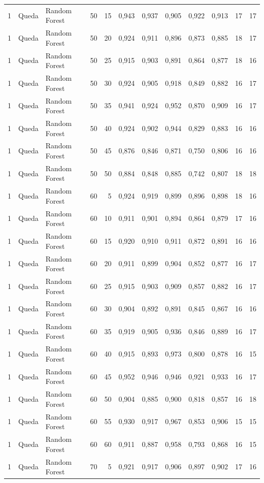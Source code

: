 \begin{longtable}{@{}rllrrrrrrrrr@{}}
1 & Queda & Random Forest & 50 & 15 & 0,943 & 0,937 & 0,905 & 0,922 & 0,913 & 17 & 17 \\
1 & Queda & Random Forest & 50 & 20 & 0,924 & 0,911 & 0,896 & 0,873 & 0,885 & 18 & 17 \\
1 & Queda & Random Forest & 50 & 25 & 0,915 & 0,903 & 0,891 & 0,864 & 0,877 & 18 & 16 \\
1 & Queda & Random Forest & 50 & 30 & 0,924 & 0,905 & 0,918 & 0,849 & 0,882 & 16 & 17 \\
1 & Queda & Random Forest & 50 & 35 & 0,941 & 0,924 & 0,952 & 0,870 & 0,909 & 16 & 17 \\
1 & Queda & Random Forest & 50 & 40 & 0,924 & 0,902 & 0,944 & 0,829 & 0,883 & 16 & 16 \\
1 & Queda & Random Forest & 50 & 45 & 0,876 & 0,846 & 0,871 & 0,750 & 0,806 & 16 & 16 \\
1 & Queda & Random Forest & 50 & 50 & 0,884 & 0,848 & 0,885 & 0,742 & 0,807 & 18 & 18 \\
1 & Queda & Random Forest & 60 & 5 & 0,924 & 0,919 & 0,899 & 0,896 & 0,898 & 18 & 16 \\
1 & Queda & Random Forest & 60 & 10 & 0,911 & 0,901 & 0,894 & 0,864 & 0,879 & 17 & 16 \\
1 & Queda & Random Forest & 60 & 15 & 0,920 & 0,910 & 0,911 & 0,872 & 0,891 & 16 & 16 \\
1 & Queda & Random Forest & 60 & 20 & 0,911 & 0,899 & 0,904 & 0,852 & 0,877 & 16 & 17 \\
1 & Queda & Random Forest & 60 & 25 & 0,915 & 0,903 & 0,909 & 0,857 & 0,882 & 16 & 17 \\
1 & Queda & Random Forest & 60 & 30 & 0,904 & 0,892 & 0,891 & 0,845 & 0,867 & 16 & 16 \\
1 & Queda & Random Forest & 60 & 35 & 0,919 & 0,905 & 0,936 & 0,846 & 0,889 & 16 & 17 \\
1 & Queda & Random Forest & 60 & 40 & 0,915 & 0,893 & 0,973 & 0,800 & 0,878 & 16 & 15 \\
1 & Queda & Random Forest & 60 & 45 & 0,952 & 0,946 & 0,946 & 0,921 & 0,933 & 16 & 17 \\
1 & Queda & Random Forest & 60 & 50 & 0,904 & 0,885 & 0,900 & 0,818 & 0,857 & 16 & 18 \\
1 & Queda & Random Forest & 60 & 55 & 0,930 & 0,917 & 0,967 & 0,853 & 0,906 & 15 & 15 \\
1 & Queda & Random Forest & 60 & 60 & 0,911 & 0,887 & 0,958 & 0,793 & 0,868 & 16 & 15 \\
1 & Queda & Random Forest & 70 & 5 & 0,921 & 0,917 & 0,906 & 0,897 & 0,902 & 17 & 16 \\

\end{longtable}
